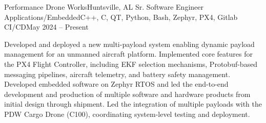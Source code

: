 \Experience
{Performance Drone Works}{Huntsville, AL}
{Sr. Software Engineer Applications/Embedded}{C++, C, QT, Python, Bash, Zephyr, PX4, Gitlab CI/CD}{May 2024 – Present}

Developed and deployed a new multi-payload system enabling dynamic payload management for an unmanned aircraft platform. Implemented core features for the PX4 Flight Controller, including EKF selection mechanisms, Protobuf-based messaging pipelines, aircraft telemetry, and battery safety management. Developed embedded software on Zephyr RTOS and led the end-to-end development and production of multiple software and hardware products from initial design through shipment. Led the integration of multiple payloads with the PDW Cargo Drone (C100), coordinating system-level testing and deployment.